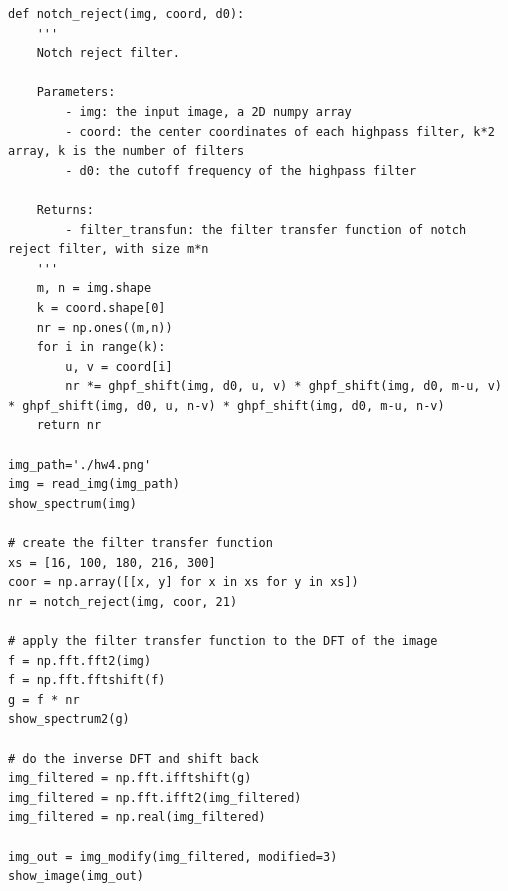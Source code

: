 \documentclass[UTF8]{ctexart}
\begin{document}
\begin{lstlisting}
def notch_reject(img, coord, d0):
    '''
    Notch reject filter.
    
    Parameters:
        - img: the input image, a 2D numpy array
        - coord: the center coordinates of each highpass filter, k*2 array, k is the number of filters
        - d0: the cutoff frequency of the highpass filter
        
    Returns:
        - filter_transfun: the filter transfer function of notch reject filter, with size m*n
    '''
    m, n = img.shape
    k = coord.shape[0]
    nr = np.ones((m,n))
    for i in range(k):
        u, v = coord[i]
        nr *= ghpf_shift(img, d0, u, v) * ghpf_shift(img, d0, m-u, v) * ghpf_shift(img, d0, u, n-v) * ghpf_shift(img, d0, m-u, n-v)
    return nr

img_path='./hw4.png'
img = read_img(img_path)
show_spectrum(img)

# create the filter transfer function
xs = [16, 100, 180, 216, 300]
coor = np.array([[x, y] for x in xs for y in xs])
nr = notch_reject(img, coor, 21)

# apply the filter transfer function to the DFT of the image
f = np.fft.fft2(img)
f = np.fft.fftshift(f)
g = f * nr
show_spectrum2(g)

# do the inverse DFT and shift back
img_filtered = np.fft.ifftshift(g)
img_filtered = np.fft.ifft2(img_filtered)
img_filtered = np.real(img_filtered)

img_out = img_modify(img_filtered, modified=3)
show_image(img_out)
\end{lstlisting}
\end{document}
